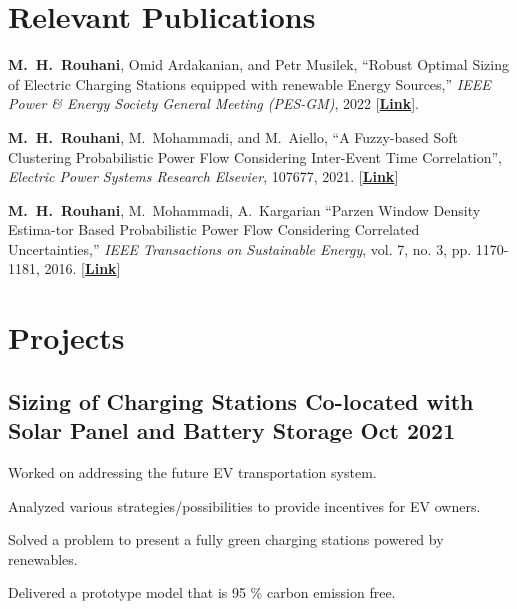 \documentclass[letter,11pt]{article}
\begin{document}
\section{Relevant Publications}
\begin{zitemize}
	\item \textbf{M.~H.~Rouhani}, Omid Ardakanian, and Petr Musilek, ``Robust Optimal Sizing of Electric Charging Stations equipped with renewable Energy Sources,'' \textit{IEEE Power \&  Energy Society General Meeting (PES-GM)}, 2022 [\href{https://github.com/Hadi2525/hadi2525.github.io/blob/main/papers/EV_Charging_Scheduling_Summary_Report.pdf}{\textbf{Link}}].
	
	\item \textbf{M.~H.~Rouhani}, M.~Mohammadi, and M.~Aiello, ``A Fuzzy-based Soft Clustering Probabilistic Power Flow Considering Inter-Event Time Correlation'', \textit{Electric Power Systems Research Elsevier}, 107677,  2021. [\href{https://www.sciencedirect.com/science/article/pii/S0378779621006581}{\textbf{Link}}]
	
	\item  \textbf{M.~H.~Rouhani}, M.~Mohammadi, A.~Kargarian ``Parzen Window Density Estima-tor Based Probabilistic Power Flow Considering Correlated Uncertainties,'' \textit{IEEE Transactions on Sustainable Energy}, vol. 7, no. 3, pp. 1170-1181, 2016. [\href{https://ieeexplore.ieee.org/abstract/document/7434076}{\textbf{Link}}]
	
	
	
\end{zitemize}
\section{Projects}
	
	\subsection{Sizing of Charging Stations Co-located with Solar Panel and Battery Storage \hfill Oct 2021}
\begin{zitemize}
	\item Worked on addressing the future EV transportation system.
	\item Analyzed various strategies/possibilities to provide incentives for EV owners.
	\item Solved a problem to present a fully green charging stations powered by renewables.
	\item Delivered a prototype model that is 95 \% carbon emission free.
\end{zitemize}
\end{document}
